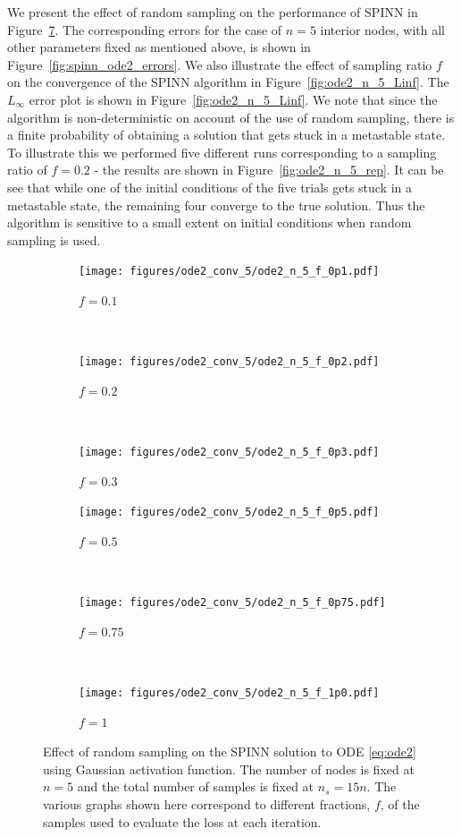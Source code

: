 \documentclass[12pt]{article}
\newcommand{\rr}[1]{#1}
\newcommand{\new}[1]{#1}
\begin{document}
\new{We present the effect of random sampling on the performance of SPINN in Figure~\ref{fig:spinn_ode2_rs}.} \rr{The corresponding errors for the case of $n=5$ interior nodes, with all other parameters fixed as mentioned above, is shown in Figure~\ref{fig:spinn_ode2_errors}}. We also illustrate the effect of sampling ratio $f$ on the convergence of the SPINN algorithm in Figure~\ref{fig:ode2_n_5_Linf}. \rr{The  $L_\infty$ error plot is shown in Figure~\ref{fig:ode2_n_5_Linf}. We note that since the algorithm is non-deterministic on account of the use of random sampling, there is a finite probability of obtaining a solution that gets stuck in a metastable state. To illustrate this we performed five different runs corresponding to a sampling ratio of $f=0.2$ - the results are shown in Figure~\ref{fig:ode2_n_5_rep}. It can be see that while one of the initial conditions of the five trials gets stuck in a metastable state, the remaining four converge to the true solution. Thus the algorithm is sensitive to a small extent on initial conditions when random sampling is used.}

\begin{figure}
\begin{subfigure}{0.32\textwidth}
\centering
\texttt{[image: figures/ode2\_conv\_5/ode2\_n\_5\_f\_0p1.pdf]}
\caption{$f = 0.1$}
\label{fig:ode2_n_5_f_0p1}
\end{subfigure}
~
\begin{subfigure}{0.32\textwidth}
\centering
\texttt{[image: figures/ode2\_conv\_5/ode2\_n\_5\_f\_0p2.pdf]}
\caption{$f=0.2$}
\label{fig:ode2_n_5_f_0p2_a}
\end{subfigure}
~
\begin{subfigure}{0.32\textwidth}
\centering
\texttt{[image: figures/ode2\_conv\_5/ode2\_n\_5\_f\_0p3.pdf]}
\caption{$f=0.3$}
\label{fig:ode2_n_5_f_0p3}
\end{subfigure}
\begin{subfigure}{0.32\textwidth}
\centering
\texttt{[image: figures/ode2\_conv\_5/ode2\_n\_5\_f\_0p5.pdf]}
\caption{$f=0.5$}
\label{fig:ode2_n_5_0p5}
\end{subfigure}
~
\begin{subfigure}{0.32\textwidth}
\centering
\texttt{[image: figures/ode2\_conv\_5/ode2\_n\_5\_f\_0p75.pdf]}
\caption{$f=0.75$}
\label{fig:ode2_n_5_0p75}
\end{subfigure}
~
\begin{subfigure}{0.32\textwidth}
\centering
\texttt{[image: figures/ode2\_conv\_5/ode2\_n\_5\_f\_1p0.pdf]}
\caption{$f=1$}
\label{fig:ode2_n_5_1}
\end{subfigure}
\caption{Effect of random sampling on the SPINN solution to ODE \eqref{eq:ode2} using Gaussian activation function. The number of nodes is fixed at $n=5$ and the total number of samples is fixed at $n_s = 15n$. The various graphs shown here correspond to different fractions, $f$, of the samples used to evaluate the loss at each iteration.}
\label{fig:spinn_ode2_rs}
\end{figure}
\end{document}
